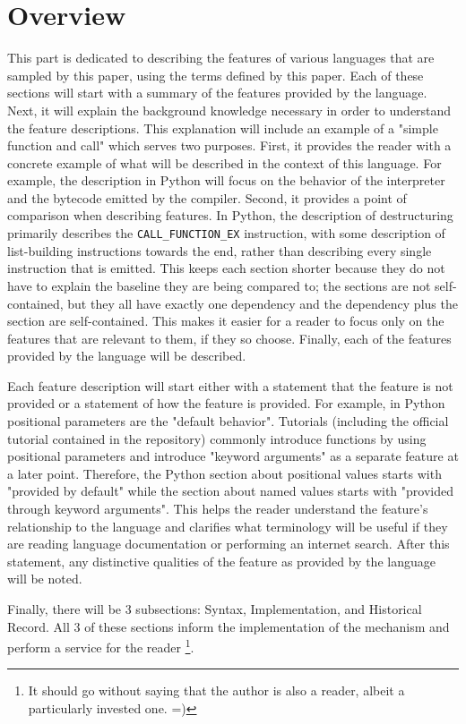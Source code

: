 \section{Overview}
This part is dedicated to describing the features of various languages that are sampled
by this paper, using the terms defined by this paper.
Each of these sections will start with a summary of the features provided by the language.
Next, it will explain the background knowledge necessary in order to understand the
feature descriptions.
This explanation will include an example of a "simple function and call" which serves two
purposes.
First, it provides the reader with a concrete example of what will be described in the
context of this language.
For example, the description in Python will focus on the behavior of the interpreter and
the bytecode emitted by the compiler.
Second, it provides a point of comparison when describing features.
In Python, the description of destructuring primarily describes the
\texttt{CALL\_FUNCTION\_EX} instruction, with some description of list-building
instructions towards the end, rather than describing every single instruction that is
emitted.
This keeps each section shorter because they do not have to explain the baseline they are
being compared to; the sections are not self-contained, but they all have exactly one
dependency and the dependency plus the section are self-contained.
This makes it easier for a reader to focus only on the features that are relevant to them,
if they so choose.
Finally, each of the features provided by the language will be described.

Each feature description will start either with a statement that the feature is not
provided or a statement of how the feature is provided.
For example, in Python positional parameters are the "default behavior".
Tutorials (including the official tutorial contained in the repository) commonly introduce
functions by using positional parameters and introduce "keyword arguments" as a separate
feature at a later point.
Therefore, the Python section about positional values starts with "provided by default"
while the section about named values starts with "provided through keyword arguments".
This helps the reader understand the feature's relationship to the language and clarifies
what terminology will be useful if they are reading language documentation or performing
an internet search.
After this statement, any distinctive qualities of the feature as provided by the language
will be noted.

Finally, there will be 3 subsections: Syntax, Implementation, and Historical Record.
All 3 of these sections inform the implementation of the mechanism and perform a service
for the reader
\footnote{It should go without saying that the author is also a reader, albeit a
particularly invested one. =)}.

